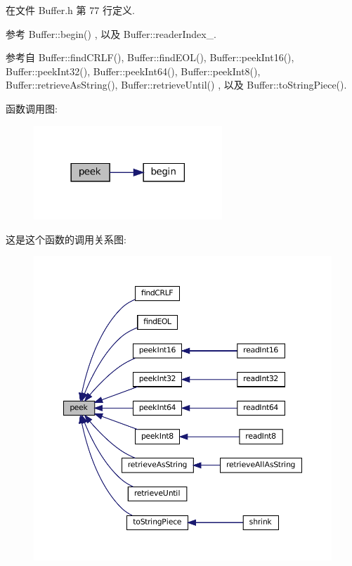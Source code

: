在文件 Buffer.\+h 第 77 行定义.



参考 Buffer\+::begin() , 以及 Buffer\+::reader\+Index\+\_\+.



参考自 Buffer\+::find\+C\+R\+L\+F(), Buffer\+::find\+E\+O\+L(), Buffer\+::peek\+Int16(), Buffer\+::peek\+Int32(), Buffer\+::peek\+Int64(), Buffer\+::peek\+Int8(), Buffer\+::retrieve\+As\+String(), Buffer\+::retrieve\+Until() , 以及 Buffer\+::to\+String\+Piece().

函数调用图\+:
\nopagebreak
\begin{figure}[H]
\begin{center}
\leavevmode
\includegraphics[width=201pt]{classmuduo_1_1net_1_1Buffer_ad1339d8b1a42e9762ae6cd3add003706_cgraph}
\end{center}
\end{figure}
这是这个函数的调用关系图\+:
\nopagebreak
\begin{figure}[H]
\begin{center}
\leavevmode
\includegraphics[width=350pt]{classmuduo_1_1net_1_1Buffer_ad1339d8b1a42e9762ae6cd3add003706_icgraph}
\end{center}
\end{figure}
\mbox{\label{classmuduo_1_1net_1_1Buffer_af9c96d31bad4ac1ff73d31672bc324c3}} 
